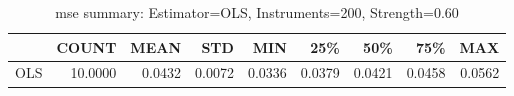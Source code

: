 \begin{table}[ht]
\centering
\caption{mse summary: Estimator=OLS, Instruments=200, Strength=0.60}
\begin{tabular}{lrrrrrrrr}
\toprule
 & COUNT & MEAN & STD & MIN & 25\% & 50\% & 75\% & MAX \\
\midrule
OLS & 10.0000 & 0.0432 & 0.0072 & 0.0336 & 0.0379 & 0.0421 & 0.0458 & 0.0562 \\
\bottomrule
\end{tabular}
\end{table}
